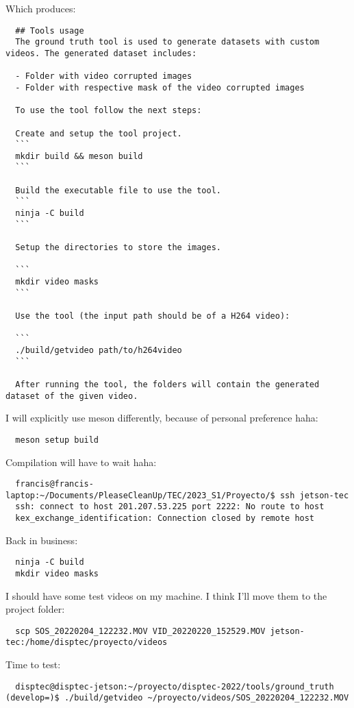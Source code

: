 \documentclass[12pt,oneside]{book}
\begin{document}
Which produces:
\begin{lstlisting}
  ## Tools usage
  The ground truth tool is used to generate datasets with custom videos. The generated dataset includes:
  
  - Folder with video corrupted images
  - Folder with respective mask of the video corrupted images
  
  To use the tool follow the next steps:
  
  Create and setup the tool project.
  ```
  mkdir build && meson build
  ```
  
  Build the executable file to use the tool.
  ```
  ninja -C build
  ```
  
  Setup the directories to store the images.
  
  ```
  mkdir video masks
  ```
  
  Use the tool (the input path should be of a H264 video):
  
  ```
  ./build/getvideo path/to/h264video
  ```
  
  After running the tool, the folders will contain the generated dataset of the given video.  
  \end{lstlisting}

I will explicitly use meson differently, because of personal preference haha:
\begin{lstlisting}
  meson setup build \end{lstlisting}
Compilation will have to wait haha:
\begin{lstlisting}
  francis@francis-laptop:~/Documents/PleaseCleanUp/TEC/2023_S1/Proyecto/$ ssh jetson-tec 
  ssh: connect to host 201.207.53.225 port 2222: No route to host
  kex_exchange_identification: Connection closed by remote host \end{lstlisting}

Back in business:
\begin{lstlisting}
  ninja -C build
  mkdir video masks\end{lstlisting}

I should have some test videos on my machine. I think I'll move them to the project folder:
\begin{lstlisting}
  scp SOS_20220204_122232.MOV VID_20220220_152529.MOV jetson-tec:/home/disptec/proyecto/videos \end{lstlisting}

Time to test:
\begin{lstlisting}
  disptec@disptec-jetson:~/proyecto/disptec-2022/tools/ground_truth (develop=)$ ./build/getvideo ~/proyecto/videos/SOS_20220204_122232.MOV \end{lstlisting}
\end{document}
